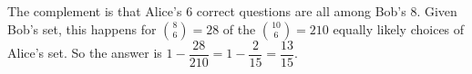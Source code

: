The complement is that Alice's $6$ correct questions are all among Bob's $8$. Given Bob's set, this happens for $\binom86=28$ of the $\binom{10}6=210$ equally likely choices of Alice's set. So the answer is $1-\dfrac{28}{210}=1-\dfrac2{15}=\boxed{\dfrac{13}{15}}$.
